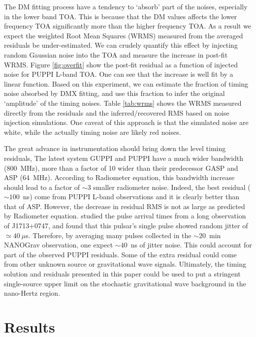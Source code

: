 The DM fitting process have a tendency to
`absorb' part of the noises, especially in the lower band TOA. This is because
that the DM values affects the lower frequency TOA significantly more than the
higher frequency TOA. 
As a result we expect the weighted Root Mean Squares (WRMS) measured from the
averaged residuals be under-estimated. We can crudely quantify
this effect by injecting random Gaussian noise into the TOA and
measure the increase in post-fit WRMS. Figure \ref{fig:overfit} show
the post-fit residual as a function of injected noise for PUPPI L-band TOA. 
One can see that the increase is well fit by a linear function. 
Based on this experiment, we
can estimate the fraction of timing noise absorbed by DMX fitting, and use
this fraction to infer the original `amplitude' of the timing noises. 
Table \ref{tab:wrms} shows the WRMS measured directly from the residuals and 
the inferred/recovered RMS based on noise injection simulations. One caveat 
of this approach is that the simulated noise are white, while the actually timing
noise are likely red noises. 


The great advance in instrumentation should bring down the level timing residuals,
The latest system GUPPI and PUPPI have a much wider bandwidth (800~MHz), more than
a factor of 10 wider than their predecessor GASP and ASP (64~MHz). According to Radiometer 
equation, this bandwidth increase should lead to a factor of $\sim3$
smaller radiometer noise. 
Indeed, the best residual ($\sim100$~ns) come from PUPPI L-band observations and it is clearly better than that of ASP. However, the decrease in residual RMS is not as large as predicted by Radiometer equation.
\citet{sc12} studied the pulse arrival times from a long observation of
J1713+0747, and found that this pulsar's single pulse showed random jitter of
$\simeq40~\mu$s. Therefore, by averaging many pulses collected in the
$\sim20$~min NANOGrav observation, one expect $\sim 40$~ns of jitter noise. 
This could account for part of the observed PUPPI residuals.
Some of the extra residual could come from other unknown source or gravitational wave signals.
Ultimately, the timing solution and residuals presented in this paper could be used to put a stringent single-source upper limit on the stochastic gravitational wave background in the nano-Hertz region.



\section{Results}
\label{sec:res}

